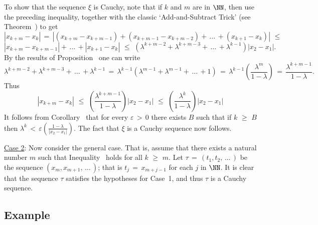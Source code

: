         To show that the sequence ${\xi}$ is Cauchy, note that if $k$ and $m$ are in ${\NN}$, then use the preceding inequality, together with the classic `Add-and-Subtract Trick' (see Theorem~) to get
        \begin{displaymath}
        |x_{k+m}-x_{k}| \,=\, |(x_{k+m}-x_{k+m-1}) + (x_{k+m-1}-x_{k+m-2}) + \,{\ldots}\, + (x_{k+1}-x_{k})|\,\,{\leq}\,\,
        \end{displaymath}
        \begin{displaymath}
        |x_{k+m}-x_{k+m-1}| + \,{\ldots}\, + |x_{k+1}-x_{k}|\,\,{\leq}\,\,
         \left({\lambda}^{k+m-2} + {\lambda}^{k+m-3} + \,{\ldots}\, + {\lambda}^{k-1}\right)|x_{2}-x_{1}|.
        \end{displaymath}
    By the results of Proposition~ one can write
        \begin{displaymath}
        {\lambda}^{k+m-2} + {\lambda}^{k+m-3} + \,{\ldots}\, + {\lambda}^{k-1} \,=\, {\lambda}^{k-1}({\lambda}^{m-1} + {\lambda}^{m-1}+\,{\ldots}\,+1) \,=\, {\lambda}^{k-1}\left(\frac{{\lambda}^{m}}{1-{\lambda}}\right) \,=\, 
    \frac{{\lambda}^{k+m-1}}{1-{\lambda}}.
        \end{displaymath}
    Thus
        \begin{displaymath}
        |x_{k+m}-x_{k}|\,\,{\leq}\,\,\left(\frac{{\lambda}^{k+m-1}}{1-{\lambda}}\right)|x_{2}-x_{1}|\,\,{\leq}\,\,\left(\frac{{\lambda}^{k}}{1-{\lambda}}\right)|x_{2}-x_{1}|
        \end{displaymath}
    It follows from Corollary~ that for every ${\varepsilon}\,>\,0$ there exists $B$ such that if $k\,\,{\geq}\,\,B$ then ${\lambda}^{k}\,<\,{\varepsilon}\left(\frac{1-{\lambda}}{|x_{2}-x_{1}|}\right)$.
    The fact that ${\xi}$ is a Cauchy sequence now follows.

\V

        \underline{Case 2}: Now consider the general case.
    That is, assume that there exists a natural number $m$ such that Inequality~ holds for all $k\,\,{\geq}\,\,m$.
    Let ${\tau} \,=\, (t_{1},t_{2},\,{\ldots}\,)$ be the sequence $(x_{m},x_{m+1},\,{\ldots}\,)$;
    that is $t_{j} \,=\, x_{m+j-1}$ for each $j$ in ${\NN}$. It is clear that the sequence ${\tau}$ satisfies the hypotheses for Case~1, and thus ${\tau}$ is a Cauchy sequence.

\VV

            \subsection{\small{\bf Example}}
            \label{ExampC70.55}

